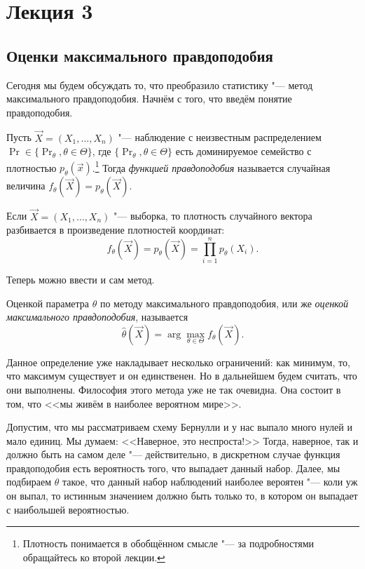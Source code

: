
\section{Лекция 3}
\subsection{Оценки максимального правдоподобия}
Сегодня мы будем обсуждать то, что преобразило статистику "--- метод максимального правдоподобия. Начнём с того, что введём понятие правдоподобия.
\begin{definition}
    Пусть $\vec{X} = (X_{1}, \ldots, X_{n})$ "--- наблюдение с неизвестным распределением $\Pr \in \{\Pr_{\theta}, \theta \in \Theta\}$, где $\{\Pr_{\theta}, \theta \in \Theta\}$ есть доминируемое семейство с плотностью $p_{\theta}(\vec{x})$.\footnote{Плотность понимается в обобщённом смысле "--- за подробностями обращайтесь ко второй лекции.} Тогда \emph{функцией правдоподобия} называется случайная величина $f_{\theta}(\vec{X}) = p_{\theta}(\vec{X})$.
\end{definition}
\begin{remark}
    Если $\vec{X} = (X_{1}, \ldots, X_{n})$ "--- выборка, то плотность случайного вектора разбивается в произведение плотностей координат:
    \[
        f_{\theta}(\vec{X}) = p_{\theta}(\vec{X}) = \prod_{i = 1}^{n} p_{\theta}(X_{i}).
    \]
\end{remark}
Теперь можно ввести и сам метод.
\begin{definition}
    Оценкой параметра $\theta$ по методу максимального правдоподобия, или же \emph{оценкой максимального правдоподобия}, называется
    \[
        \hat{\theta}(\vec{X}) = \arg\max_{\theta \in \Theta} f_{\theta}(\vec{X}).
    \]
\end{definition}
Данное определение уже накладывает несколько ограничений: как минимум, то, что максимум существует и он единственен. Но в дальнейшем будем считать, что они выполнены. Философия этого метода уже не так очевидна. Она состоит в том, что <<мы живём в наиболее вероятном мире>>.

Допустим, что мы рассматриваем схему Бернулли и у нас выпало много нулей и мало единиц. Мы думаем: <<Наверное, это неспроста!>> Тогда, наверное, так и должно быть на самом деле "--- действительно, в дискретном случае функция правдоподобия есть вероятность того, что выпадает данный набор. Далее, мы подбираем $\theta$ такое, что данный набор наблюдений наиболее вероятен "--- коли уж он выпал, то истинным значением должно быть только то, в котором он выпадает с наибольшей вероятностью.

